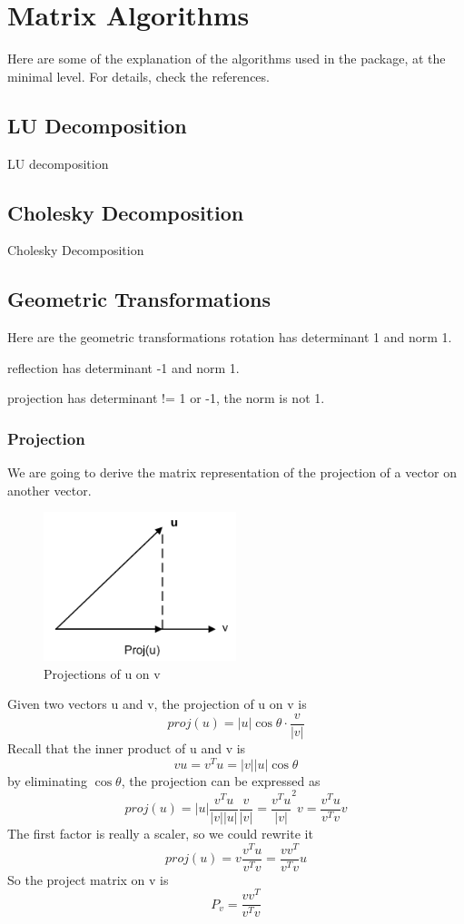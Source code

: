 \chapter{Matrix Algorithms}
\minitoc
Here are some of the explanation of the algorithms used in the package, at the minimal level. For details, check the references.

\section{LU Decomposition}
LU decomposition

\section{Cholesky Decomposition}
Cholesky Decomposition

\section{Geometric Transformations}
Here are the geometric transformations
rotation has determinant 1 and norm 1.

reflection has determinant -1 and norm 1.

projection has determinant != 1 or -1, the norm is not 1.

\subsection{Projection}
We are going to derive the matrix representation of the projection of a vector on another vector. 
\begin{figure}[htp]
\centerline{
\includegraphics[bb=20 0 230 150,width=0.5\textwidth] {chap4/projection1.png}
}
\caption{Projections of u on v}
\label{figure:projection1}
\end{figure}
Given two vectors u and v, the projection of u on v is
\[proj(u) = |u|\cos\theta \cdotp {\frac{v}{|v|}}\]
Recall that the inner product of u and v is
\[vu = v^Tu = |v||u|\cos\theta\]
by eliminating $\cos\theta$, the projection can be expressed as
\[proj(u) = |u| {\frac{v^Tu}{|v||u|}} {\frac{v} {|v|}} =
{\frac{v^Tu}{|v|}^2} v = {\frac{v^Tu}{v^Tv}} v\]
The first factor is really a scaler, so we could rewrite it
\[proj(u) = v {\frac{v^Tu}{v^Tv}} = {\frac{vv^T}{v^Tv}}u\]
So the project matrix on v is
\begin{equation}
P_v = {\frac{vv^T}{v^Tv}}
\end{equation}

